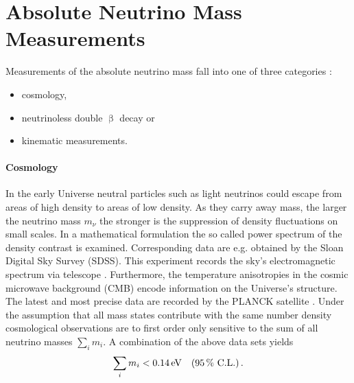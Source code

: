 \section{Absolute Neutrino Mass Measurements}
\label{sec:absoluteNuMassMeasurement}
Measurements of the absolute neutrino mass fall into one of three categories \cite{Otten:2008zz}:
\begin{itemize}
    \renewcommand{\labelitemi}{$\bullet$}
    \item cosmology,
    \item neutrinoless double $\upbeta$ decay or
    \item kinematic measurements.
\end{itemize}
\paragraph{Cosmology}
In the early Universe neutral particles such as light neutrinos could escape from areas of high density to areas of low density. As they carry away mass, the larger the neutrino mass $m_\nu$ the stronger is the suppression of density fluctuations on small scales. In a mathematical formulation the so called power spectrum of the density contrast is examined. Corresponding data are e.g. obtained by the Sloan Digital Sky Survey (SDSS). This experiment records the sky's electromagnetic spectrum via telescope \cite{Doroshkevich2004}. Furthermore, the temperature anisotropies in the cosmic microwave background (CMB) encode information on the Universe's structure. The latest and most precise data are recorded by the PLANCK satellite \cite{Aghanim:2018}. Under the assumption that all mass states contribute with the same number density cosmological observations are to first order only sensitive to the sum of all neutrino masses $\sum_{i} m_i$. A combination of the above data sets yields \cite{Yeche:2017upn}
\begin{equation*}
    \sum_i m_i < \SI{0.14}{eV} \quad (\SI{95}{\percent} \text{ C.L.}) \text{\,.}
\end{equation*}


